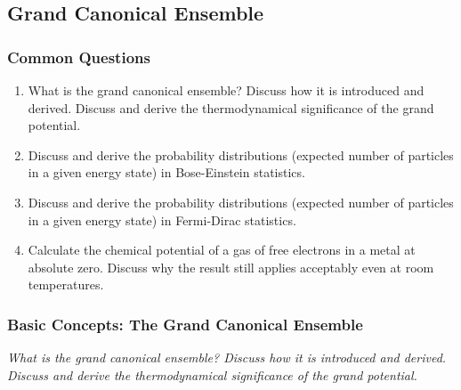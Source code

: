 \documentclass[11pt, a4paper]{article}
\begin{document}
\subsection{Grand Canonical Ensemble}

\subsubsection{Common Questions}
\begin{enumerate}
    \item What is the grand canonical ensemble? Discuss how it is introduced and derived. Discuss and derive the thermodynamical significance of the grand potential.

    \item Discuss and derive the probability distributions (expected number of particles in a given energy state) in Bose-Einstein statistics.

    \item Discuss and derive the probability distributions (expected number of particles in a given energy state) in Fermi-Dirac statistics.

    \item Calculate the chemical potential of a gas of free electrons in a metal at absolute zero. Discuss why the result still applies acceptably even at room temperatures.

\end{enumerate}


\subsubsection{Basic Concepts: The Grand Canonical Ensemble}
\textit{What is the grand canonical ensemble? Discuss how it is introduced and derived. Discuss and derive the thermodynamical significance of the grand potential.}
\end{document}
